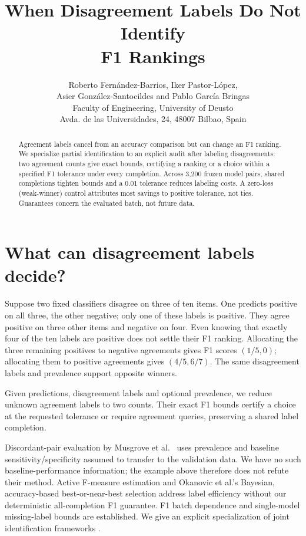 \documentclass[a4paper]{esannV2}
\newcommand{\F}{F_1}
\begin{document}
\title{When Disagreement Labels Do Not Identify\protect\\F1 Rankings}
\author{Roberto Fern\'andez-Barrios, Iker Pastor-L\'opez,\\
Asier Gonz\'alez-Santocildes and Pablo Garc\'ia Bringas
\vspace{.3cm}\\
Faculty of Engineering, University of Deusto\\
Avda. de las Universidades, 24, 48007 Bilbao, Spain
}
\maketitle
\begin{abstract}
Agreement labels cancel from an accuracy comparison but can change an F1
ranking. We specialize partial identification to an explicit audit after
labeling disagreements: two agreement counts give exact bounds, certifying a
ranking or a choice within a specified F1 tolerance under every completion.
Across 3,200 frozen model pairs, shared completions tighten bounds and a 0.01
tolerance reduces labeling costs. A zero-loss (weak-winner) control attributes
most savings to positive tolerance, not ties. Guarantees concern the evaluated
batch, not future data.
\end{abstract}

\section{What can disagreement labels decide?}
Suppose two fixed classifiers disagree on three of ten items. One predicts
positive on all three, the other negative; only one of these labels is positive.
They agree positive on three other items and negative on four. Even knowing
that exactly four of the ten labels are positive does not settle their F1
ranking. Allocating the three remaining positives to negative agreements gives
F1 scores $(1/5,0)$; allocating them to positive agreements gives $(4/5,6/7)$.
The same disagreement labels and prevalence support opposite winners.

Given predictions, disagreement labels and optional prevalence, we reduce
unknown agreement labels to two counts. Their exact F1 bounds certify a choice
at the requested tolerance or require agreement queries, preserving a shared
label completion.

Discordant-pair evaluation by Musgrove et al.\ \cite{musgrove2023} uses
prevalence and baseline sensitivity/specificity assumed to transfer to the
validation data. We have no such baseline-performance information; the example
above therefore does not refute their method. Active F-measure estimation \cite{sawade2010} and Okanovic et al.'s
Bayesian, accuracy-based best-or-near-best selection \cite{okanovic2025}
address label efficiency without our deterministic all-completion F1 guarantee.
F1 batch dependence \cite{lipton2014} and single-model missing-label bounds
\cite{dervovic2025} are established. We give an explicit specialization of
joint identification frameworks \cite{kuboyama2026,tdc,polo2024}.
\end{document}
